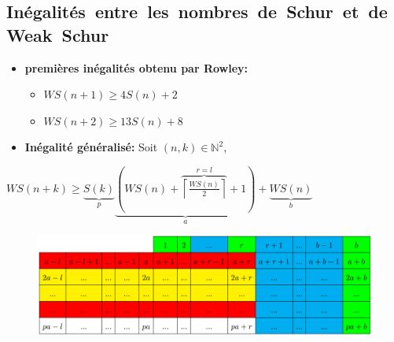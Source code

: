 \documentclass[graphics]{beamer}
\begin{document}
\subsection{Inégalités~entre~les~nombres~de~Schur~et~de~Weak~Schur}


\begin{frame}
	\begin{itemize}
		\item \textbf{premières inégalités obtenu par Rowley:}
		\vspace{3 mm}
			\begin{itemize}
			\item $WS(n+1) \geqslant 4S(n)+2$
			\item $WS(n+2) \geqslant 13S(n)+8$
			\end{itemize}
		\vspace{5 mm}
		\item \textbf{Inégalité généralisé:} 
		\vspace{5 mm} Soit $(n,k) \in \mathbb{N}^2$,
	\end{itemize}
\end{frame}

\begin{frame}
\begin{center}
$WS (n+k) \geqslant \underbrace{S(k)}_p \underbrace{\left (WS (n) +\overbrace{\left \lceil 					\displaystyle \frac{WS (n)}{2}
			\right \rceil}^{r=l} +1 \right)}_a + \underbrace{WS (n)}_b$
\end{center}

\begin{figure}
        \centering
        \includegraphics[scale=0.35]{tableau.png}
\end{figure}
\end{frame}
\end{document}
